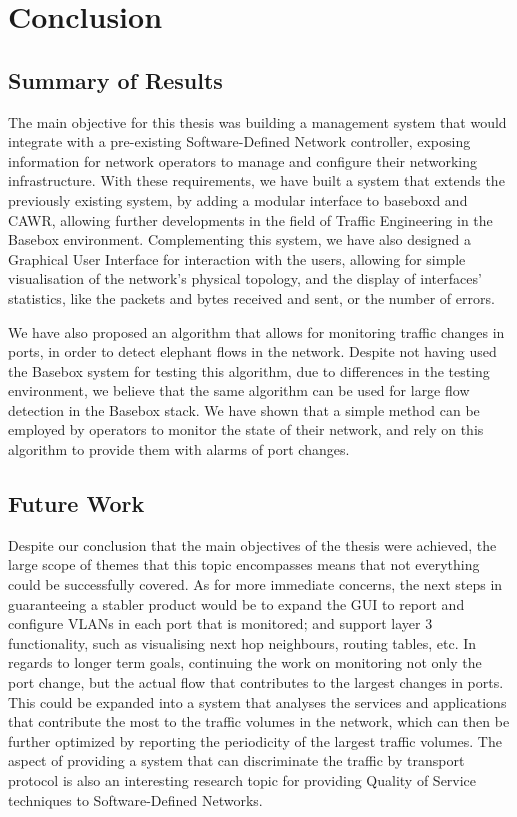 \chapter{Conclusion}

\section{Summary of Results}

The main objective for this thesis was building a management system that would integrate with a pre-existing Software-Defined Network controller, exposing information
for network operators to manage and configure their networking infrastructure. With these requirements, we have built a system that extends the previously
existing system, by adding a modular interface to baseboxd and CAWR, allowing further developments in the field of Traffic Engineering in the Basebox environment.
Complementing this system, we have also designed a Graphical User Interface for interaction with the users, allowing for simple visualisation of the network's
physical topology, and the display of interfaces' statistics, like the packets and bytes received and sent, or the number of errors. 

\par We have also proposed an algorithm that allows for monitoring traffic changes in ports, in order to detect elephant flows in the network. Despite not having
used the Basebox system for testing this algorithm, due to differences in the testing environment, we believe that the same algorithm can be used for large flow 
detection in the Basebox stack. We have shown that a simple method can be employed by operators to monitor the state of their network, and rely on this algorithm
to provide them with alarms of port changes.

\section{Future Work}

Despite our conclusion that the main objectives of the thesis were achieved, the large scope of themes that this topic encompasses means that not everything could be 
successfully covered. As for more immediate concerns, the next steps in guaranteeing a stabler product would be to expand the GUI to report and configure VLANs in 
each port that is monitored; and support layer 3 functionality, such as visualising next hop neighbours, routing tables, etc. In regards to longer term goals, 
continuing the work on monitoring not only the port change, but the actual flow that contributes to the largest changes in ports. This could be expanded into a
system that analyses the services and applications that contribute the most to the traffic volumes in the network, which can then be further optimized by reporting
the periodicity of the largest traffic volumes. The aspect of providing a system that can discriminate the traffic by transport protocol is also an interesting
research topic for providing Quality of Service techniques to Software-Defined Networks.
